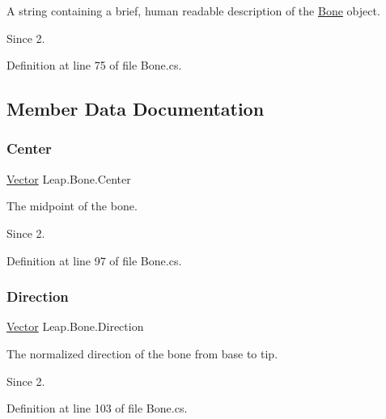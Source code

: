 A string containing a brief, human readable description of the \mbox{\hyperlink{class_leap_1_1_bone}{Bone}} object. 

\begin{DoxySince}{Since}
2. 
\end{DoxySince}


Definition at line 75 of file Bone.\+cs.



\subsection{Member Data Documentation}
\mbox{\label{class_leap_1_1_bone_a820e1a7a9975c41ca14aec7c806b9c65}} 
\subsubsection{\texorpdfstring{Center}{Center}}
{\footnotesize\ttfamily \mbox{\hyperlink{struct_leap_1_1_vector}{Vector}} Leap.\+Bone.\+Center}



The midpoint of the bone. 

\begin{DoxySince}{Since}
2. 
\end{DoxySince}


Definition at line 97 of file Bone.\+cs.

\mbox{\label{class_leap_1_1_bone_a15e47cfdff3b474b9da055ae15aec82e}} 
\subsubsection{\texorpdfstring{Direction}{Direction}}
{\footnotesize\ttfamily \mbox{\hyperlink{struct_leap_1_1_vector}{Vector}} Leap.\+Bone.\+Direction}



The normalized direction of the bone from base to tip. 

\begin{DoxySince}{Since}
2. 
\end{DoxySince}


Definition at line 103 of file Bone.\+cs.

\mbox{\label{class_leap_1_1_bone_ab10b9823a94b21069ded7fe9cbf92dc8}} 
